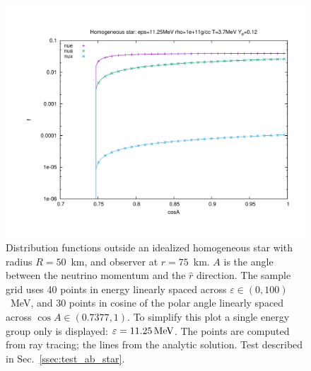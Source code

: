 \documentclass[aps,floatfix,prd,superscriptaddress,twocolumn]{revtex4-1}
\begin{document}
\begin{figure}
  \includegraphics[width=\columnwidth]{fig-f-absorption_star-11MeV}
  \caption{Distribution functions outside an idealized homogeneous star
    with radius $R=50$~km, and observer at $r=75$~km.
    $A$ is the angle between the neutrino momentum and the $\hat{r}$ direction.
    The sample grid uses 40 points in energy linearly spaced across
    $\varepsilon\in(0,100)$~MeV,
    and 30 points in cosine of the polar angle linearly spaced across
    $\cos A\in(0.7377,1)$.
    To simplify this plot a single energy group only is displayed:
    $\varepsilon=11.25\,{\rm MeV}$.
    The points are computed from ray tracing; the lines from the analytic
    solution.
    Test described in Sec.~\ref{ssec:test_ab_star}.
  }
  \label{fig:f_absorption_sphere}
\end{figure}
\end{document}
